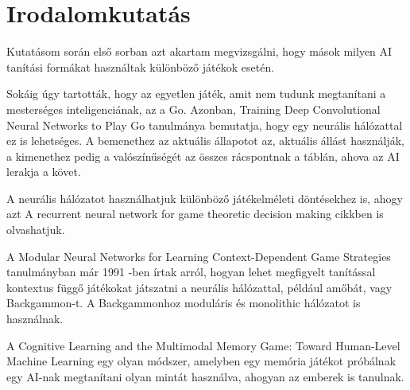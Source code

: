 \chapter{Irodalomkutatás}

\thispagestyle{fancy}
\pagestyle{fancy}

Kutatásom során első sorban azt akartam megvizsgálni, hogy mások milyen AI tanítási formákat használtak különböző játékok esetén. 

Sokáig úgy tartották, hogy az egyetlen játék, amit nem tudunk megtanítani a mesterséges inteligenciának, az a Go. Azonban, Training Deep Convolutional Neural Networks to Play Go tanulmánya \cite{pmlr-v37-clark15} bemutatja,
 hogy egy neurális hálózattal ez is lehetséges. A bemenethez az aktuális állapotot az, aktuális állást használják, a kimenethez pedig a valószínűségét az összes rácspontnak a táblán, ahova az AI lerakja a követ. 

 A neurális hálózatot használhatjuk különböző játékelméleti döntésekhez is, ahogy azt A recurrent neural network for game theoretic decision making \cite{bhatia2014recurrent} cikkben is olvashatjuk. 

A Modular Neural Networks for Learning Context-Dependent Game Strategies \cite{boyan1992modular} tanulmányban már 1991 -ben írtak arról, hogyan lehet megfigyelt tanítással kontextus függő játékokat játszatni a neurális hálózattal, például amőbát, vagy Backgammon-t. A Backgammonhoz moduláris és monolithic hálózatot is használnak. 

A Cognitive Learning and the Multimodal Memory Game: Toward Human-Level Machine Learning \cite{4634261} egy olyan módszer, amelyben egy memória játékot próbálnak egy AI-nak megtanítani olyan mintát használva, ahogyan az emberek is tanulnak.